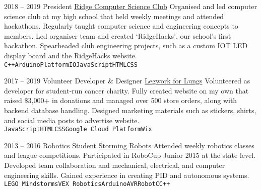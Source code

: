 \documentclass[9pt]{developercv} %
\begin{document}
\begin{entrylist}
	\entry
	{2018 -- 2019}
	{President}
	{\href{https://ridgecompsci.club}{Ridge Computer Science Club}}
	{
		Organised and led computer science club at my high school that held weekly meetings and attended hackathons.
		Regularly taught computer science and engineering concepts to members.
		Led organiser team and created ‘RidgeHacks’, our school’s first hackathon.
		Spearheaded club engineering projects, such as a custom IOT LED display board and the RidgeHacks website.
		\\
		\texttt{C++}\slashsep\texttt{Arduino}\slashsep\texttt{PlatformIO}\slashsep\texttt{JavaScript}\slashsep\texttt{HTML}\slashsep\texttt{CSS}
	}

	\entry
	{2017 -- 2019}
	{Volunteer Developer \& Designer}
	{\href{http://www.legworkforlungs.org}{Legwork for Lungs}}
	{
		Volunteered as developer for student-run cancer charity.
		Fully created website on my own that raised \$3,000+ in donations and managed over 500 store orders, along with backend database handling.
		Designed marketing materials such as stickers, shirts, and social media posts to advertise website.
		\\
		\texttt{JavaScript}\slashsep\texttt{HTML}\slashsep\texttt{CSS}\slashsep\texttt{Google Cloud Platform}\slashsep\texttt{Wix}
	}

	\entry
	{2013 -- 2016}
	{Robotics Student}
	{\href{https://stormingrobots.com/prod/default.html}{Storming Robots}}
	{
		Attended weekly robotics classes and league competitions.
		Participated in RoboCup Junior 2015 at the state level.
		Developed team collaboration and mechanical, electrical, and computer engineering skills.
		Gained experience in creating PID and autonomous systems.
		\\
		\texttt{LEGO Mindstorms}\slashsep\texttt{VEX Robotics}\slashsep\texttt{Arduino}\slashsep\texttt{AVR}\slashsep\texttt{RobotC}\slashsep\texttt{C++}
	}

\end{entrylist}


\end{document}
